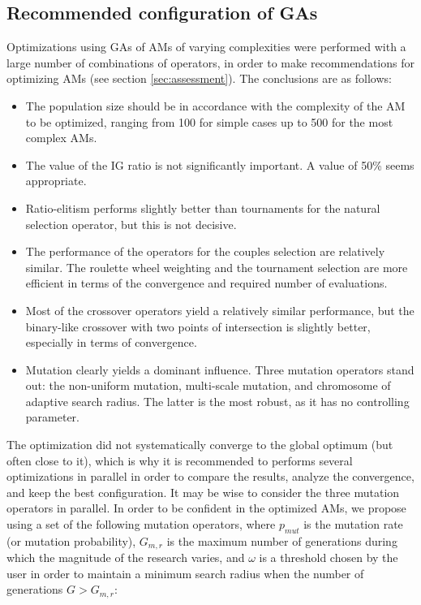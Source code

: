 \documentclass{ametsoc}
\begin{document}
\subsection{Recommended configuration of GAs}
\label{sec:recommendations}

Optimizations using GAs of AMs of varying complexities were performed with a large number of combinations of operators, in order to make recommendations for optimizing AMs (see section \ref{sec:assessment}). The conclusions are as follows:

\begin{itemize}
	\item The population size should be in accordance with the complexity of the AM to be optimized, ranging from 100 for simple cases up to 500 for the most complex AMs.
	
	\item The value of the IG ratio is not significantly important. A value of 50\% seems appropriate.
	
	\item Ratio-elitism performs slightly better than tournaments for the natural selection operator, but this is not decisive.
	
	\item The performance of the operators for the couples selection are relatively similar. The roulette wheel weighting and the tournament selection are more efficient in terms of the convergence and required number of evaluations.
	
	\item Most of the crossover operators yield a relatively similar performance, but the binary-like crossover with two points of intersection is slightly better, especially in terms of convergence.
	
	\item Mutation clearly yields a dominant influence. Three mutation operators stand out: the non-uniform mutation, multi-scale mutation, and chromosome of adaptive search radius. The latter is the most robust, as it has no controlling parameter.
	
\end{itemize}

The optimization did not systematically converge to the global optimum (but often close to it), which is why it is recommended to performs several optimizations in parallel in order to compare the results, analyze the convergence, and keep the best configuration. It may be wise to consider the three mutation operators in parallel. In order to be confident in the optimized AMs, we propose using a set of the following mutation operators, where $p_{mut}$ is the mutation rate (or mutation probability), $G_{m,r}$ is the maximum number of generations during which the magnitude of the research varies, and $\omega$ is a threshold chosen by the user in order to maintain a minimum search radius when the number of generations $G>G_{m,r}$:
\end{document}

